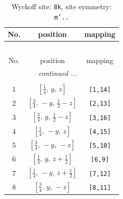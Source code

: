 \documentclass[fleqn,8pt]{jsarticle}
\begin{document}
\begin{longtable}{ccc}
\caption{Wyckoff site: {\tt 8k}, site symmetry: {\tt m'..}}
 \\
 \hline \hline
No. & position & mapping \\ \hline \endfirsthead

\multicolumn{2}{l}{\tablename\ \thetable{}} \\
 \hline \hline
No. & position & mapping \\ \hline \endhead

 \hline \hline
\multicolumn{2}{r}{\footnotesize\it continued ...} \\ \endfoot

 \hline \hline
\multicolumn{2}{r}{} \\ \endlastfoot

1 & $\left[ \frac{1}{4},\, y,\, z \right]$ & {\tt [1,14]} \\ \hline
2 & $\left[ \frac{3}{4},\, - y,\, \frac{1}{2} - z \right]$ & {\tt [2,13]} \\ \hline
3 & $\left[ \frac{3}{4},\, y,\, \frac{1}{2} - z \right]$ & {\tt [3,16]} \\ \hline
4 & $\left[ \frac{1}{4},\, - y,\, z \right]$ & {\tt [4,15]} \\ \hline
5 & $\left[ \frac{3}{4},\, - y,\, - z \right]$ & {\tt [5,10]} \\ \hline
6 & $\left[ \frac{1}{4},\, y,\, z + \frac{1}{2} \right]$ & {\tt [6,9]} \\ \hline
7 & $\left[ \frac{1}{4},\, - y,\, z + \frac{1}{2} \right]$ & {\tt [7,12]} \\ \hline
8 & $\left[ \frac{3}{4},\, y,\, - z \right]$ & {\tt [8,11]} \\
\end{longtable}
\renewcommand{\arraystretch}{1.2}
\end{document}
